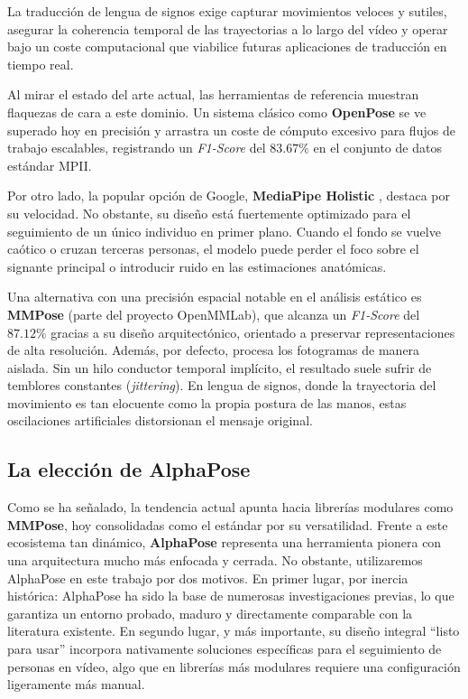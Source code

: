 La traducción de lengua de signos exige capturar movimientos veloces y sutiles, asegurar la coherencia temporal de las trayectorias a lo largo del vídeo y operar bajo un coste computacional que viabilice futuras aplicaciones de traducción en tiempo real.

Al mirar el estado del arte actual, las herramientas de referencia muestran flaquezas de cara a este dominio.
Un sistema clásico como \textbf{OpenPose} \cite{OpenPose} se ve superado hoy en precisión y arrastra un coste de cómputo excesivo para flujos de trabajo escalables, registrando un \textit{F1-Score} del $83.67\%$ en el conjunto de datos estándar MPII.

Por otro lado, la popular opción de Google, \textbf{MediaPipe Holistic} \cite{mediapipe}, destaca por su velocidad.
No obstante, su diseño está fuertemente optimizado para el seguimiento de un único individuo en primer plano.
Cuando el fondo se vuelve caótico o cruzan terceras personas, el modelo puede perder el foco sobre el signante principal o introducir ruido en las estimaciones anatómicas.


Una alternativa con una precisión espacial notable en el análisis estático es \textbf{MMPose} (parte del proyecto OpenMMLab), que alcanza un \textit{F1-Score} del $87.12\%$ gracias a su diseño arquitectónico, orientado a preservar representaciones de alta resolución.
Además, por defecto, procesa los fotogramas de manera aislada.
Sin un hilo conductor temporal implícito, el resultado suele sufrir de temblores constantes (\textit{jittering}).
En lengua de signos, donde la trayectoria del movimiento es tan elocuente como la propia postura de las manos, estas oscilaciones artificiales distorsionan el mensaje original.

\subsection{La elección de AlphaPose}
Como se ha señalado, la tendencia actual apunta hacia librerías modulares como \textbf{MMPose}, hoy consolidadas como el estándar por su versatilidad.
Frente a este ecosistema tan dinámico, \textbf{AlphaPose} \cite{alphapose} representa una herramienta pionera con una arquitectura mucho más enfocada y cerrada.
No obstante, utilizaremos AlphaPose en este trabajo por dos motivos.
En primer lugar, por inercia histórica: AlphaPose ha sido la base de numerosas investigaciones previas, lo que garantiza un entorno probado, maduro y directamente comparable con la literatura existente.
En segundo lugar, y más importante, su diseño integral ``listo para usar'' incorpora nativamente soluciones específicas para el seguimiento de personas en vídeo, algo que en librerías más modulares requiere una configuración ligeramente más manual.


